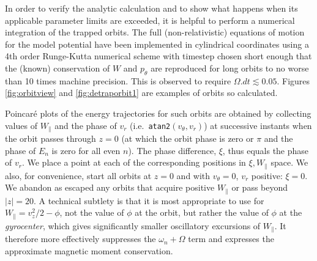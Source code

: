 \documentclass{agujournal2019}
\begin{document}
In order to verify the analytic calculation and to show what happens
when its applicable parameter limits are exceeded, it is helpful to
perform a numerical integration of the trapped orbits. The full
(non-relativistic) equations of motion for the model potential have
been implemented in cylindrical coordinates using a 4th order
Runge-Kutta numerical scheme with timestep chosen short enough that
the (known) conservation of $W$ and $p_\theta$ are reproduced for long
orbits to no worse than 10 times machine precision. This is observed
to require $\Omega.dt\lesssim 0.05$. Figures \ref{fig:orbitview} and
\ref{fig:detraporbit1} are 
examples of orbits so calculated.

Poincar\'e plots of the energy trajectories for such orbits are
obtained by collecting values of $W_\parallel$ and the phase of $v_r$
(i.e.\ \verb!atan2!$(v_\theta,v_r)$) at successive instants when the orbit passes through $z=0$ (at which
the orbit phase is zero or $\pi$ and the phase of $E_n$ is zero for
all even $n$). The phase difference, $\xi$, thus equals the phase of
$v_r$. We place a point at each of the corresponding positions in
$\xi,W_\parallel$ space. We also, for convenience, start all orbits at
$z=0$ and with $v_\theta=0$, $v_r$ positive: $\xi=0$. We abandon as escaped any
orbits that acquire positive $W_\parallel$ or pass beyond $|z|=20$.  A
technical subtlety is that it is most appropriate to use for
$W_\parallel=v_z^2/2-\phi$, not the value of $\phi$ at the orbit, but
rather the value of $\phi$ at the \emph{gyrocenter}, which gives
significantly smaller oscillatory excursions of $W_\parallel$. It
therefore more effectively suppresses the $\omega_n+\Omega$ term and
expresses the approximate magnetic moment conservation.
\end{document}

